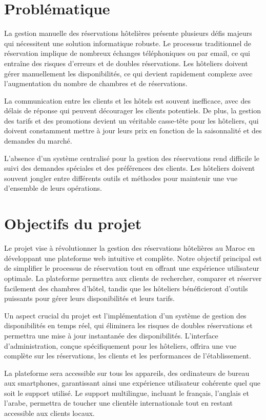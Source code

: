 \documentclass[12pt,a4paper]{report}
\begin{document}
\section{Problématique}
La gestion manuelle des réservations hôtelières présente plusieurs défis majeurs qui nécessitent une solution informatique robuste. Le processus traditionnel de réservation implique de nombreux échanges téléphoniques ou par email, ce qui entraîne des risques d'erreurs et de doubles réservations. Les hôteliers doivent gérer manuellement les disponibilités, ce qui devient rapidement complexe avec l'augmentation du nombre de chambres et de réservations.

La communication entre les clients et les hôtels est souvent inefficace, avec des délais de réponse qui peuvent décourager les clients potentiels. De plus, la gestion des tarifs et des promotions devient un véritable casse-tête pour les hôteliers, qui doivent constamment mettre à jour leurs prix en fonction de la saisonnalité et des demandes du marché.

L'absence d'un système centralisé pour la gestion des réservations rend difficile le suivi des demandes spéciales et des préférences des clients. Les hôteliers doivent souvent jongler entre différents outils et méthodes pour maintenir une vue d'ensemble de leurs opérations.

\section{Objectifs du projet}
Le projet vise à révolutionner la gestion des réservations hôtelières au Maroc en développant une plateforme web intuitive et complète. Notre objectif principal est de simplifier le processus de réservation tout en offrant une expérience utilisateur optimale. La plateforme permettra aux clients de rechercher, comparer et réserver facilement des chambres d'hôtel, tandis que les hôteliers bénéficieront d'outils puissants pour gérer leurs disponibilités et leurs tarifs.

Un aspect crucial du projet est l'implémentation d'un système de gestion des disponibilités en temps réel, qui éliminera les risques de doubles réservations et permettra une mise à jour instantanée des disponibilités. L'interface d'administration, conçue spécifiquement pour les hôteliers, offrira une vue complète sur les réservations, les clients et les performances de l'établissement.

La plateforme sera accessible sur tous les appareils, des ordinateurs de bureau aux smartphones, garantissant ainsi une expérience utilisateur cohérente quel que soit le support utilisé. Le support multilingue, incluant le français, l'anglais et l'arabe, permettra de toucher une clientèle internationale tout en restant accessible aux clients locaux.
\end{document}
